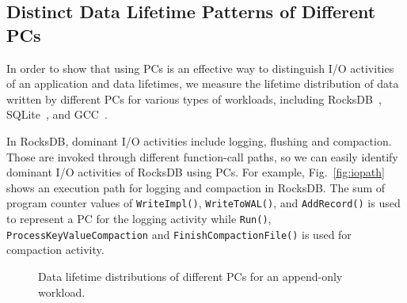 
\subsection{Distinct Data Lifetime Patterns of Different PCs}
In order to show that using PCs is an effective way to distinguish I/O
activities of an application and data lifetimes, we measure the lifetime
distribution of data written by different PCs for various types of workloads,
including RocksDB~\cite{RocksDB}, SQLite~\cite{SQLite}, and GCC~\cite{GCC}.


In RocksDB, dominant I/O activities include logging, flushing and compaction.
Those are invoked through different function-call paths, so we can easily
identify dominant I/O activities of RocksDB using PCs.  
For example, Fig.~\ref{fig:iopath} shows an execution
path for logging and compaction in RocksDB.  The sum of program counter values of
\texttt{WriteImpl()}, \texttt{WriteToWAL()}, and \texttt{AddRecord()} is used
to represent a PC for the logging activity while  \texttt{Run()}, 
\texttt{ProcessKeyValueCompaction} and \texttt{FinishCompactionFile()} is used
for compaction activity.

\begin{figure}[t]
\centering
\hfill
	\hspace{2pt}
\hfill
\vspace{7pt}
	\hspace{2pt}
\caption{Data lifetime distributions of different PCs for an append-only workload.} 
\label{fig:types_and_PCs}
\end{figure}


